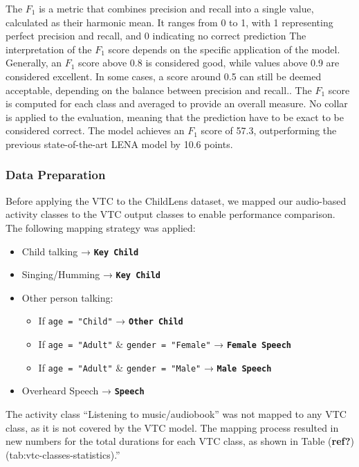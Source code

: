 \documentclass[
  man,floatsintext]{apa6}
\providecommand{\tightlist}{%
  \setlength{\itemsep}{0pt}\setlength{\parskip}{0pt}}
\begin{document}
The \(F_1\) is a metric that combines precision and recall into a single value, calculated as their harmonic mean. It ranges from 0 to 1, with 1 representing perfect precision and recall, and 0 indicating no correct prediction The interpretation of the \(F_1\) score depends on the specific application of the model. Generally, an \(F_1\) score above 0.8 is considered good, while values above 0.9 are considered excellent. In some cases, a score around 0.5 can still be deemed acceptable, depending on the balance between precision and recall.. The \(F_1\) score is computed for each class and averaged to provide an overall measure. No collar is applied to the evaluation, meaning that the prediction have to be exact to be considered correct. The model achieves an \(F_1\) score of 57.3, outperforming the previous state-of-the-art LENA model by 10.6 points.

\subsubsection{Data Preparation}\label{data-preparation}

Before applying the VTC to the ChildLens dataset, we mapped our audio-based activity classes to the VTC output classes to enable performance comparison. The following mapping strategy was applied:

\begin{itemize}
\tightlist
\item
  Child talking → \textbf{\texttt{Key\ Child}}
\item
  Singing/Humming → \textbf{\texttt{Key\ Child}}
\item
  Other person talking:

  \begin{itemize}
  \tightlist
  \item
    If \texttt{age\ =\ "Child"} → \textbf{\texttt{Other\ Child}}
  \item
    If \texttt{age\ =\ "Adult"} \& \texttt{gender\ =\ "Female"} → \textbf{\texttt{Female\ Speech}}
  \item
    If \texttt{age\ =\ "Adult"} \& \texttt{gender\ =\ "Male"} → \textbf{\texttt{Male\ Speech}}
  \end{itemize}
\item
  Overheard Speech → \textbf{\texttt{Speech}}
\end{itemize}

The activity class ``Listening to music/audiobook'' was not mapped to any VTC class, as it is not covered by the VTC model. The mapping process resulted in new numbers for the total durations for each VTC class, as shown in Table (\textbf{ref?})(tab:vtc-classes-statistics).''
\end{document}
